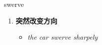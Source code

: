 
\begin{frame}
{\huge swerve}
\begin{center}
\begin{enumerate}\Large
  \item \textbf{突然改变方向}
  \begin{itemize}
    \item \em{\Large{the car swerve sharpely}}
  \end{itemize}
\end{enumerate}
\end{center}
\end{frame}
